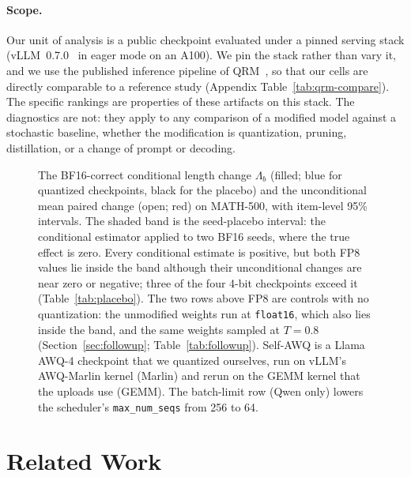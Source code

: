 \documentclass[11pt,a4paper]{article}
\begin{document}
\paragraph{Scope.} Our unit of analysis is a public checkpoint evaluated under a pinned serving stack (vLLM~0.7.0~\cite{kwon2023vllm} in eager mode on an A100). We pin the stack rather than vary it, and we use the published inference pipeline of QRM~\cite{liu2025qrm}, so that our cells are directly comparable to a reference study (Appendix Table~\ref{tab:qrm-compare}). The specific rankings are properties of these artifacts on this stack. The diagnostics are not: they apply to any comparison of a modified model against a stochastic baseline, whether the modification is quantization, pruning, distillation, or a change of prompt or decoding.

\begin{figure}[t]
\centering

\caption{The BF16-correct conditional length change $\Lambda_b$ (filled; blue for quantized checkpoints, black for the placebo) and the unconditional mean paired change (open; red) on MATH-500, with item-level 95\% intervals. The shaded band is the seed-placebo interval: the conditional estimator applied to two BF16 seeds, where the true effect is zero. Every conditional estimate is positive, but both FP8 values lie inside the band although their unconditional changes are near zero or negative; three of the four 4-bit checkpoints exceed it (Table~\ref{tab:placebo}). The two rows above FP8 are controls with no quantization: the unmodified weights run at \texttt{float16}, which also lies inside the band, and the same weights sampled at $T=0.8$ (Section~\ref{sec:followup}; Table~\ref{tab:followup}). Self-AWQ is a Llama AWQ-4 checkpoint that we quantized ourselves, run on vLLM's AWQ-Marlin kernel (Marlin) and rerun on the GEMM kernel that the uploads use (GEMM). The batch-limit row (Qwen only) lowers the scheduler's \texttt{max\_num\_seqs} from 256 to 64.}
\label{fig:placebo}
\end{figure}

\section{Related Work}
\label{sec:related}
\end{document}
